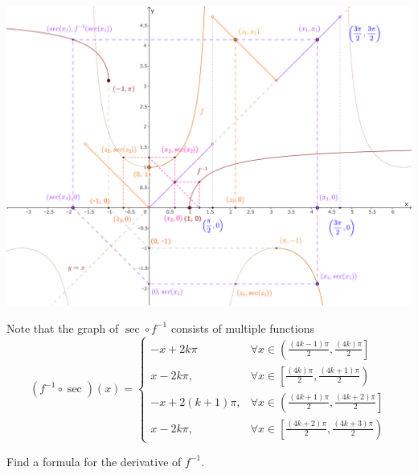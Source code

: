 \documentclass{article}
\begin{document}
\begin{center}
    \includegraphics[width=16cm]{./svg/pdf/derivative-2-1d.pdf}
\end{center}

\begin{soln}
    Note that the graph of $\sec \circ f^{-1}$ consists of multiple functions
    \[
        (f^{-1} \circ \sec)(x) = 
        \begin{cases}
            -x + 2k\pi& \forall x \in \left( \frac{(4k-1) \pi}{2}, \frac{(4k) \pi}{2} \right]\\
            x - 2k\pi,& \forall x \in \left[ \frac{(4k) \pi}{2}, \frac{(4k+1) \pi}{2} \right)\\
            -x + 2(k+1)\pi,& \forall x \in \left( \frac{(4k+1) \pi}{2}, \frac{(4k + 2) \pi}{2} \right]\\
            x - 2k\pi,& \forall x \in \left[ \frac{(4k + 2) \pi}{2}, \frac{(4k+3) \pi}{2} \right)
        \end{cases}
    \]
\end{soln}

\newpage

\begin{problem*}[1e]
    Find a formula for the derivative of $f^{-1}.$
\end{problem*}
\end{document}
